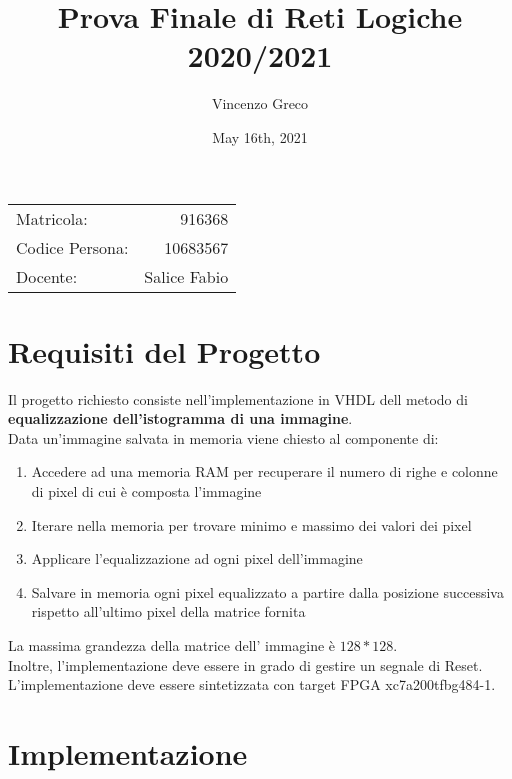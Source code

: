 \documentclass{article}
\title{Prova Finale di Reti Logiche 2020/2021} %
\author{Vincenzo Greco} %
\date{May 16th, 2021}
\begin{document}
\maketitle %
\begin{center}
\begin{tabular}{l r}
Matricola: & 916368\\ %
Codice Persona: & 10683567\\
Docente: & Salice Fabio	 %
\end{tabular}
\end{center}

\section{Requisiti del Progetto}

Il progetto richiesto consiste nell'implementazione in VHDL dell metodo di \textbf{
equalizzazione dell’istogramma di una immagine}.\\
Data un'immagine salvata in memoria viene chiesto al componente di:
\begin{enumerate}
\item Accedere ad una memoria RAM per recuperare il numero di righe e colonne di pixel di cui è composta l'immagine
\item Iterare nella memoria per trovare minimo e massimo dei valori dei pixel
\item Applicare l'equalizzazione ad ogni pixel dell'immagine
\item Salvare in memoria ogni pixel equalizzato a partire dalla posizione successiva rispetto all'ultimo pixel della matrice fornita
\end{enumerate}

La massima grandezza della matrice dell' immagine è \(128 * 128\).\\
Inoltre, l'implementazione deve essere in grado di gestire un segnale di Reset. L'implementazione deve essere sintetizzata con target FPGA xc7a200tfbg484-1.

\newpage
\noindent


\section{Implementazione}
\end{document}
